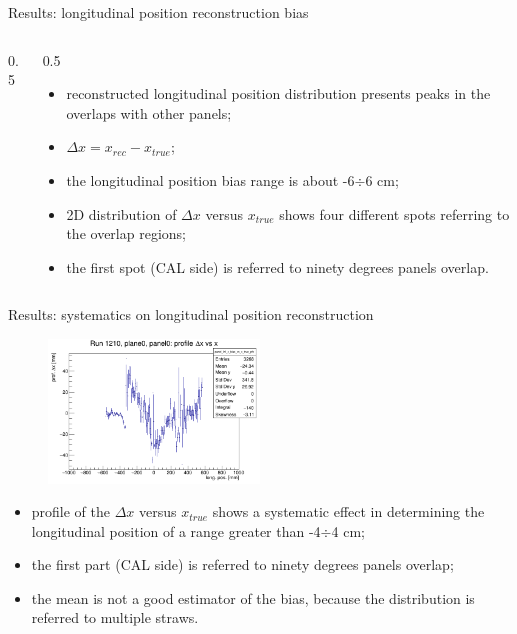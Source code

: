 \documentclass{beamer}[10pt]
\begin{document}
\begin{frame}{Results: longitudinal position reconstruction bias}
\begin{columns}
\begin{column}{0.5\framewidth}
    \end{column}
    \begin{column}{0.5\framewidth}
      \begin{itemize}
       
      \item reconstructed longitudinal position distribution presents peaks in the overlaps with other panels;
        \vspace{3mm}
      \item $\Delta x = x_{rec}-x_{true}$;
      \vspace{3mm}
        \item the longitudinal position bias range is about -6$\div$6 cm;
        \vspace{3mm}
        \item 2D distribution of $\Delta x$ versus $x_{true}$ shows four different spots referring to the overlap regions;
        \vspace{3mm}
        \item the first spot (CAL side) is referred to ninety degrees panels overlap.
      \end{itemize}
    \end{column}
  \end{columns}
\end{frame}


\begin{frame}{Results: systematics on longitudinal position reconstruction}

   
    \begin{figure}[H]
      \centering
      \includegraphics[width= 0.5\textwidth]{figures/pdf/panel_00_x_bias_vs_x_prof.png}
      \label{fig:enter-label}
  \end{figure}
   
      \begin{itemize}
      
        
        \item  profile of the $\Delta x$ versus $x_{true}$ shows a systematic effect in determining the longitudinal position of a range greater than -4$\div$4 cm;
        \vspace{3mm}
        \item the first part (CAL side) is referred to ninety degrees panels overlap;
        \vspace{3mm}
        \item the mean is not a good estimator of the bias, because the distribution is referred to multiple straws.
      \end{itemize}

  
\end{frame}
\end{document}
